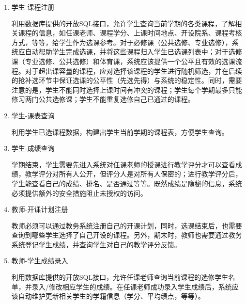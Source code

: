 \begin{enumerate}
  \item 学生-课程注册
  
  \CJKindent 利用数据库提供的开放SQL接口，允许学生查询当前学期的各类课程，了解相关课程的信息，如任课老师、课程学分、上课时间地点、开设院系、课程考核方式，等等，给学生作为选课参考。对于必修课（公共选修、专业选修），系统应自动帮助学生完成选课，并将这些课程归入学生已选课列表中；对于选修课（专业选修、公共选修）和体育课，系统应该提供一个公平且有效的选课流程。对于超出课容量的课程，应对选择该课程的学生进行随机筛选，并在后续的抢补选环节中保证选课的公平性（先选先得）与系统的稳定性。同时，需要注意的是，学生不能同时选择上课时间有冲突的课程；学生每个学期最多只能修习两门公共选修课；学生不能重复选修自己已通过的课程。
  
  \item 学生-课表查询
  
  \CJKindent 利用学生已选课程数据，构建出学生当前学期的课程表，方便学生查询。
  
  \item 学生-成绩查询
  
  \CJKindent 学期结束，学生需要先进入系统对任课老师的授课进行教学评分才可以查看成绩，教学评分对所有人公开，但评分人是对所有人保密的；进行教学评分后，学生能查看自己的成绩、排名、是否通过等等。既然成绩是隐秘的信息，系统必须提供额外的安全措施阻止未授权的访问。

  \item 教师-开课计划注册
  
  \CJKindent 教师必须可以通过教务系统注册自己的开课计划，同时，选课结束后，也需要查询到哪些学生选择了自己开设的课程。另外，期末时，教师也需要通过教务系统登记学生成绩，并查询学生对自己的教学评分反馈。
  
  \item 教师-学生成绩录入
  
  \CJKindent 利用数据库提供的开放SQL接口，允许任课老师查询当前课程的选修学生名单，并录入/修改相应学生的成绩。在任课老师成功录入学生成绩后，系统应该自动维护更新相关学生的学籍信息（学分、平均绩点，等等）。
\end{enumerate}

